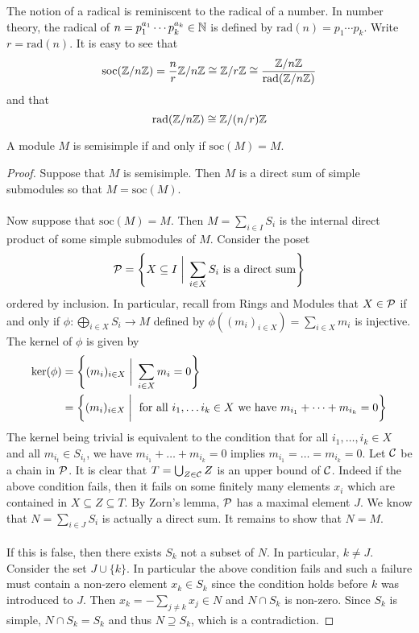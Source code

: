 \documentclass[a4paper]{article}
\begin{document}
The notion of a radical is reminiscent to the radical of a number. In number theory, the radical of $n=p_1^{a_1}\cdots p_k^{a_k}\in\mathbb{N}$ is defined by $\text{rad}(n)=p_1\cdots p_k$. Write $r=\text{rad}(n)$. It is easy to see that $$\text{soc}(\mathbb{Z}/n\mathbb{Z})=\frac{n}{r}\mathbb{Z}/n\mathbb{Z}\cong\mathbb{Z}/r\mathbb{Z}\cong\frac{\mathbb{Z}/n\mathbb{Z}}{\text{rad}(\mathbb{Z}/n\mathbb{Z})}$$ and that $$\text{rad}(\mathbb{Z}/n\mathbb{Z})\cong\mathbb{Z}/(n/r)\mathbb{Z}$$

\begin{thm}{}{} A module $M$ is semisimple if and only if $\text{soc}(M)=M$. \tcbline
\begin{proof}
Suppose that $M$ is semisimple. Then $M$ is a direct sum of simple submodules so that $M=\text{soc}(M)$. \\~\\

Now suppose that $\text{soc}(M)=M$. Then $M=\sum_{i\in I}S_i$ is the internal direct product of some simple submodules of $M$. Consider the poset $$\mathcal{P}=\left\{X\subseteq I\;\bigg{|}\;\sum_{i\in X}S_i\text{ is a direct sum}\right\}$$ ordered by inclusion. In particular, recall from Rings and Modules that $X\in\mathcal{P}$ if and only if $\phi:\bigoplus_{i\in X}S_i\to M$ defined by $\phi\left((m_i)_{i\in X}\right)=\sum_{i\in X}m_i$ is injective. The kernel of $\phi$ is given by 
\begin{align*}
\ker(\phi)&=\left\{(m_i)_{i\in X}\;\bigg{|}\;\sum_{i\in X}m_i=0\right\}\\
&=\left\{(m_i)_{i\in X}\;\bigg{|}\;\text{ for all }i_1,\dots i_k\in X\text{ we have }m_{i_1}+\dots+m_{i_k}=0\right\}
\end{align*}
The kernel being trivial is equivalent to the condition that for all $i_1,\dots,i_k\in X$ and all $m_{i_t}\in S_{i_t}$, we have $m_{i_1}+\dots+m_{i_k}=0$ implies $m_{i_1}=\dots=m_{i_k}=0$. Let $\mathcal{C}$ be a chain in $\mathcal{P}$. It is clear that $T=\bigcup_{Z\in\mathcal{C}}Z$ is an upper bound of $\mathcal{C}$. Indeed if the above condition fails, then it fails on some finitely many elements $x_i$ which are contained in $X\subseteq Z\subseteq T$. By Zorn's lemma, $\mathcal{P}$ has a maximal element $J$. We know that $N=\sum_{i\in J}S_i$ is actually a direct sum. It remains to show that $N=M$. \\~\\

If this is false, then there exists $S_k$ not a subset of $N$. In particular, $k\neq J$. Consider the set $J\cup\{k\}$. In particular the above condition fails and such a failure must contain a non-zero element $x_k\in S_k$ since the condition holds before $k$ was introduced to $J$. Then $x_k=-\sum_{j\neq k}x_j\in N$ and $N\cap S_k$ is non-zero. Since $S_k$ is simple, $N\cap S_k=S_k$ and thus $N\supseteq S_k$, which is a contradiction. 
\end{proof}
\end{thm}
\end{document}
